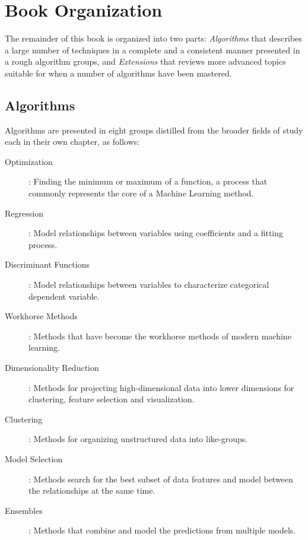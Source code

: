 
\section{Book Organization} 
\label{intro:organization}
The remainder of this book is organized into two parts: \emph{Algorithms} that describes a large number of techniques in a complete and a consistent manner presented in a rough algorithm groups, and \emph{Extensions} that reviews more advanced topics suitable for when a number of algorithms have been mastered.

% 
%
\subsection{Algorithms}
Algorithms are presented in eight groups distilled from the broader fields of study each in their own chapter, as follows: 

\begin{description}
	\item[Optimization]: Finding the minimum or maximum of a function, a process that commonly represents the core of a Machine Learning method.
	\item[Regression]: Model relationships between variables using coefficients and a fitting process.
	\item[Discriminant Functions]:	Model relationships between variables to characterize categorical dependent variable.
	\item[Workhorse Methods]: Methods that have become the workhorse methods of modern machine learning.
	\item[Dimensionality Reduction]: Methods for projecting high-dimensional data into lower dimensions for clustering, feature selection and visualization.
	\item[Clustering]: Methods for organizing unstructured data into like-groups.
	\item[Model Selection]: Methods search for the best subset of data features and model between the relationships at the same time.
	\item[Ensembles]:	Methods that combine and model the predictions from multiple models.
\end{description}

